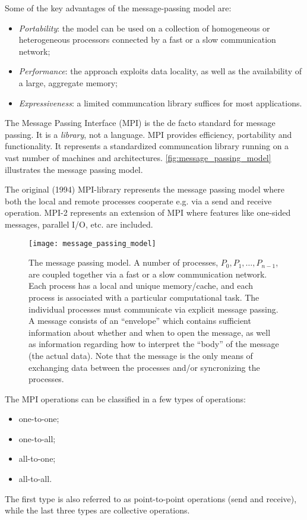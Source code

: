 Some of the key advantages of the message-passing model are:
\begin{itemize}
\item {\em Portability}: the model can be used on a collection of
homogeneous or heterogeneous processors connected by a fast or a slow
communication network;
\item {\em Performance}: the approach exploits data locality, as well as the
availability of a large, aggregate memory;
\item {\em Expressiveness}: a limited communcation library suffices for most applications.
\end{itemize}

The Message Passing Interface (MPI) is the de facto standard for message
passing. It is a \emph{library}, not a language. MPI provides efficiency,
portability and functionality. It represents a standardized communcation library
running on a vast number of machines and architectures.
\autoref{fig:message_passing_model} illustrates the message passing model.

The original (1994) MPI-library represents the message passing model where both
the local and remote processes cooperate e.g. via a send and receive
operation. MPI-2 represents an extension of MPI where features like one-sided
messages, parallel I/O, etc. are included.

\begin{figure}[htbp]
  \begin{center}
    \texttt{[image: message\_passing\_model]}
  \end{center}
  \caption{
    The message passing model. A number of processes, $P_0, P_1, \ldots,
    P_{n-1}$, are coupled together via a fast or a slow communication network.
    Each process has a local and unique memory/cache, and each process is
    associated with a particular computational task. The individual processes
    must communicate via explicit message passing. A message consists of an
    ``envelope'' which contains sufficient information about whether and when to
    open the message, as well as information regarding how to interpret the
    ``body'' of the message (the actual data). Note that the message is the only
    means of exchanging data between the processes and/or syncronizing the
    processes.
  }
  \label{fig:message_passing_model}
\end{figure}

The MPI operations can be classified in a few types of operations:
\begin{itemize}
\item one-to-one;
\item one-to-all;
\item all-to-one;
\item all-to-all.
\end{itemize}
The first type is also referred to as point-to-point operations (send and
receive), while the last three types are collective operations.

